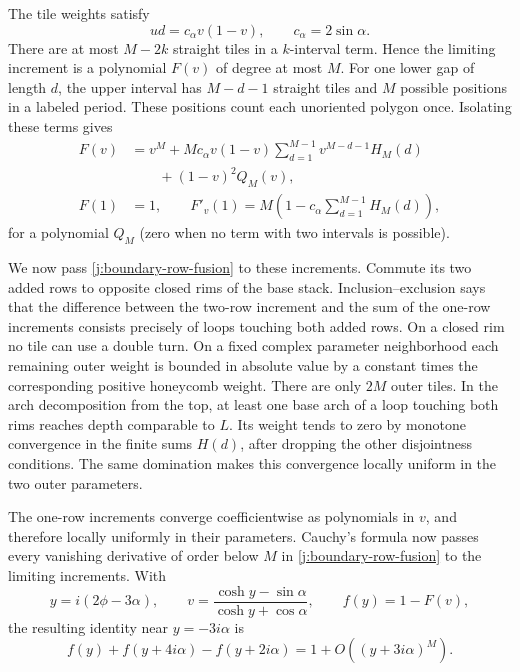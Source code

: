 The tile weights satisfy
\[
 ud=c_\alpha v(1-v),\qquad c_\alpha=2\sin\alpha.
\]
There are at most $M-2k$ straight tiles in a $k$-interval term. Hence the
limiting increment is a polynomial $F(v)$ of degree at most $M$. For one
lower gap of length $d$, the upper interval has $M-d-1$ straight tiles
and $M$ possible positions in a labeled period. These positions count
each unoriented polygon once. Isolating these terms gives
\begin{equation}\label{j:boundary-arch-derivative}
 \begin{split}
 F(v)&=v^M+
 Mc_\alpha v(1-v)\sum_{d=1}^{M-1}v^{M-d-1}H_M(d)\\
 &\qquad +(1-v)^2Q_M(v),\\
 F(1)&=1,\qquad
 F'_v(1)=M\left(1-c_\alpha\sum_{d=1}^{M-1}H_M(d)\right),
 \end{split}
\end{equation}
for a polynomial $Q_M$ (zero when no term with two intervals is possible).

We now pass \eqref{j:boundary-row-fusion} to these increments. Commute its
two added rows to opposite closed rims of the base stack.
Inclusion--exclusion says that the difference between the two-row
increment and the sum of the one-row increments consists precisely of
loops touching both added rows. On a closed rim no tile can use a double
turn. On a fixed complex parameter neighborhood each remaining outer
weight is bounded in absolute value by a constant times the corresponding
positive honeycomb weight. There are only $2M$ outer tiles. In the arch
decomposition from the top, at least one base arch of a loop touching both
rims reaches depth comparable to $L$. Its weight tends to zero by
monotone convergence in the finite sums $H(d)$, after dropping the other
disjointness conditions. The same domination makes this convergence
locally uniform in the two outer parameters.

The one-row increments converge coefficientwise as polynomials in $v$,
and therefore locally uniformly in their parameters. Cauchy's formula now
passes every vanishing derivative of order below $M$ in
\eqref{j:boundary-row-fusion} to the limiting increments. With
\[
 y=i(2\phi-3\alpha),\qquad
 v=\frac{\cosh y-\sin\alpha}{\cosh y+\cos\alpha},\qquad
 f(y)=1-F(v),
\]
the resulting identity near $y=-3i\alpha$ is
\begin{equation}\label{j:boundary-fusion-jet}
 f(y)+f(y+4i\alpha)-f(y+2i\alpha)
 =1+O((y+3i\alpha)^M).
\end{equation}

